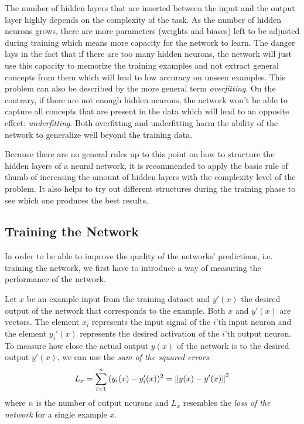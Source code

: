The number of hidden layers that are inserted between the input and
the output
layer highly depends on the complexity of the task. As the number of hidden
neurons grows, there are more parameters (weights and biases) left to
be adjusted during
training which means more capacity for the network to learn. The
danger lays in the fact that if there are too many hidden neurons, the
network will just use this capacity to memorize the training examples
and not extract general concepts from them which will lead to low
accuracy on unseen examples. This problem can also be
described by the more general term \textit{overfitting}. On the
contrary, if there are not enough hidden neurons, the network won't be
able to capture all concepts that are present in the data which will
lead to an opposite effect: \textit{underfitting}. Both overfitting
and underfitting harm the ability of the network to generalize well
beyond the training data.

Because there are no general rules up to this point on how to structure
the hidden layers of a neural network, it is recommended to apply the
basic rule of thumb of increasing the amount of hidden layers with the
complexity level of the problem. It also helps to try out different
structures during the training phase to see which one produces the
best results.

\subsection{Training the Network}

In order to be able to improve the quality of the networks'
predictions, i.e. training the network, we first have to introduce a
way of measuring the performance of the network.

Let \(x\) be an example input from the training dataset and \(y'(x)\)
the desired output of the network that corresponds to the
example. Both \(x\) and \(y'(x)\) are vectors. The element \(x_i\) represents the
input signal of the \(i\)'th input neuron and the element \(y_i'(x)\)
represents the desired activation of the \(i\)'th output neuron. To
measure how close the actual output \(y(x)\) of the network is to the
desired output \(y'(x)\), we can use the \textit{sum of the squared
  errors}:
\begin{equation}
  L_x = \sum_{i=1}^{n}{(y_i(x)-y_i'(x))^2} = \left\lVert y(x)-y'(x)\right\rVert^2
\end{equation}
where \(n\) is the number of output neurons and \(L_x\) resembles the
\textit{loss of the network} for a single example \(x\).

